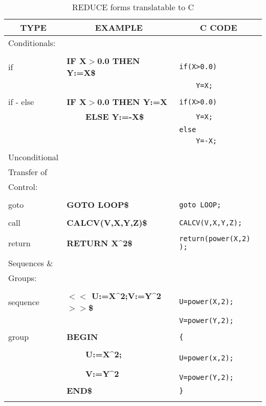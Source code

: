 \begin{table}
\begin{tabular}{||l|l|l||}\hline\hline
\multicolumn{1}{||c|}{\bf TYPE} & \multicolumn{1}{c|}{\bf EXAMPLE} &
 \multicolumn{1}{c||}{\bf C CODE} \\ \hline\hline
  Conditionals:&     &\\
&     &\\
    if  &{\bf IF X$>$0.0 THEN Y:=X\$} &\verb!if(X>0.0)!\\
&     &\verb!    Y=X;!\\
&     &\\
    if - else  &{\bf IF X$>$0.0 THEN Y:=X} &\verb!if(X>0.0)!\\
&{\bf\ \ \ \  ELSE Y:=-X\$}&\verb!    Y=X;!\\
&     &\verb!else!\\
&     &\verb!    Y=-X;!\\
& & \\\hline
  Unconditional&     &\\
  Transfer of  &     &\\
  Control:     &     &\\
&     &\\
    goto&{\bf GOTO LOOP\$} &\verb!goto LOOP;!\\
&     &\\
    call&{\bf CALCV(V,X,Y,Z)\$} &\verb!CALCV(V,X,Y,Z);!\\
&     &\\
    return     &{\bf RETURN X\^{}2\$} &\verb!return(power(X,2) );!\\
& & \\\hline
Sequences \&    &     &\\
Groups: &     &\\
&     &\\
    sequence   &{\bf $<$$<$ U:=X\^{}2;V:=Y\^{}2$>$$>$\$}&\verb!U=power(X,2);!\\
&     &\verb!V=power(Y,2);!\\
&     &\\
    group      &{\bf BEGIN}&\verb!{!\\
&{\bf\ \ \ \  U:=X\^{}2;}& \verb!      U=power(x,2);!\\
&{\bf\ \ \ \  V:=Y\^{}2} & \verb!      V=power(Y,2);!\\
&{\bf END\$}&\verb!}!\\
& & \\\hline\hline
\end{tabular}
\caption{REDUCE forms translatable to C}
\end{table}

